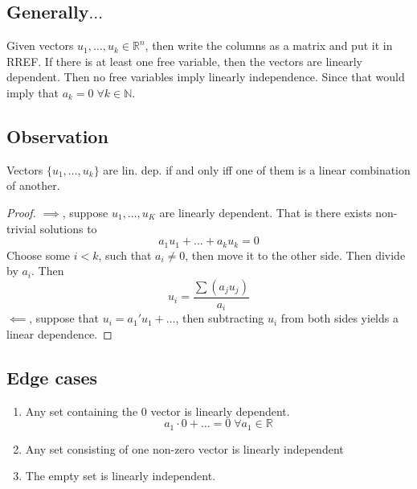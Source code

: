 \documentclass{article}
\newtheorem{one minute paper}[theorem]{One Minute Paper}
\begin{document}
\subsection*{Generally$\dots$}

Given vectors $u_1, \dots, u_k \in \mathbb{R}^n$, then write the columns as a matrix and put it in RREF. If there is at least one free variable, then the vectors are linearly dependent. Then no free variables
imply linearly independence. Since that would imply that $a_k = 0 \; \forall k \in \mathbb{N}$. 

\subsection*{Observation}

Vectors $\{u_1, \dots, u_k\}$ are lin. dep. if and only iff one of them is a linear combination of another. 

\begin{proof}
    $\implies$, suppose $u_1, \dots, u_K$ are linearly dependent. That is there exists non-trivial solutions to 
    \begin{equation}
        a_1u_1 + \dots + a_ku_k = 0
    \end{equation}
    Choose some $i < k$, such that $a_i \neq 0$, then move it to the other side. Then divide by $a_i$. Then 
    \begin{equation}
        u_i = \frac{\sum(a_ju_j)}{a_i}
    \end{equation}
    $\impliedby$, suppose that $u_i = a_1'u_1 + \dots$, then subtracting $u_i$ from both sides yields a linear dependence. 
\end{proof}

\subsection*{Edge cases}

\begin{enumerate}
    \item Any set containing the $0$ vector is linearly dependent. 
    \begin{equation}
        a_1 \cdot 0 + \dots = 0 \; \forall a_1 \in \mathbb{R}
    \end{equation}
    \item Any set consisting of one non-zero vector is linearly independent
    \item The empty set is linearly independent. 
\end{enumerate}
\end{document}
